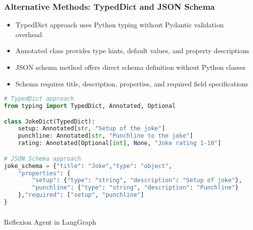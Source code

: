 \begin{frame}[fragile]\frametitle{Alternative Methods: TypedDict and JSON Schema}
      \begin{itemize}
	\item TypedDict approach uses Python typing without Pydantic validation overhead
	\item Annotated class provides type hints, default values, and property descriptions
	\item JSON schema method offers direct schema definition without Python classes
	\item Schema requires title, description, properties, and required field specifications
	  \end{itemize}

\begin{lstlisting}[language=Python, basicstyle=\tiny]
# TypedDict approach
from typing import TypedDict, Annotated, Optional

class JokeDict(TypedDict):
    setup: Annotated[str, "Setup of the joke"]
    punchline: Annotated[str, "Punchline to the joke"]
    rating: Annotated[Optional[int], None, "Joke rating 1-10"]

# JSON Schema approach
joke_schema = {"title": "Joke","type": "object",
    "properties": {
        "setup": {"type": "string", "description": "Setup of joke"},
        "punchline": {"type": "string", "description": "Punchline"}
    },"required": ["setup", "punchline"]
}
\end{lstlisting}
\end{frame}


\begin{frame}[fragile]\frametitle{}
\begin{center}
{\Large Reflexion Agent in LangGraph}
\end{center}
\end{frame}

